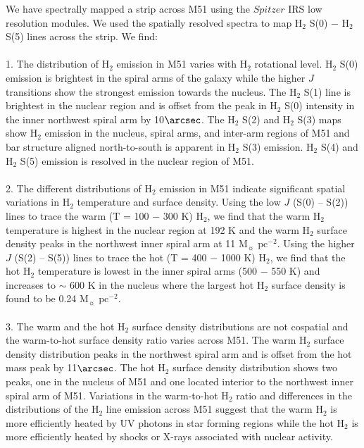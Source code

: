 \documentclass[manuscript]{aastex}
\begin{document}
We have spectrally mapped a strip across M51 using the $Spitzer$ IRS
low resolution modules.  We used the spatially resolved spectra to map
H$_2$ S(0) $-$ H$_2$ S(5) lines across
the strip.  We find:\\
\\
1.  The distribution of H$_2$
emission in M51 varies with H$_2$ rotational level.
H$_2$ S(0) emission is brightest in the spiral arms of the
galaxy while the higher $J$ transitions show the strongest emission
towards the nucleus.  The H$_2$ S(1) line is brightest
in the nuclear region and is offset from the peak in H$_2$ S(0) 
intensity in the inner northwest spiral arm by 10$\arcsec$.
The H$_2$ S(2) and H$_2$ S(3) maps show
H$_2$ emission in the nucleus, spiral arms, and inter-arm
regions of M51 and bar structure aligned north-to-south is apparent in
H$_2$ S(3) emission.  H$_2$ S(4) and H$_2$
S(5) emission is resolved in the nuclear region of M51.\\
\\
2.  The different distributions of H$_2$ emission in M51
indicate significant spatial variations in H$_2$
temperature and surface density.  Using the low $J$ (S(0) -- S(2)) lines to trace the warm (T = 100
$-$ 300 K) H$_2$, we find that the warm H$_2$
temperature is highest in the nuclear region at 192 K and
the warm H$_2$ surface density peaks in the northwest inner spiral arm
at 11 $\mathrm{M_\sun}$ $\mathrm{pc^{-2}}$.  Using the
higher $J$ (S(2) -- S(5)) lines to trace the hot (T = 400 $-$ 1000 K) H$_2$,
we find that the hot H$_2$ temperature is lowest
in the inner spiral arms (500 $-$ 550 K) and increases to $\sim$ 600 K
in the nucleus where the largest hot H$_2$ surface density
is found to be 0.24 $\mathrm{M_\sun}$ $\mathrm{pc^{-2}}$.\\
\\
3.  The warm and the hot H$_2$ surface density distributions are not
cospatial and the warm-to-hot surface density ratio varies across M51.  The warm
H$_2$ surface density distribution peaks in the northwest spiral arm and is offset from
the hot mass peak by 11$\arcsec$.  The hot H$_2$ surface density distribution 
shows two peaks, one in the nucleus of M51 and one located interior to the 
northwest inner spiral arm of M51.   Variations in the
warm-to-hot H$_2$ ratio and differences in the
distributions of the H$_2$ line emission across 
M51 suggest that the warm H$_2$ is more efficiently heated 
by UV photons in star forming regions while the hot H$_2$ is 
more efficiently heated by shocks or X-rays associated with nuclear activity.\\
\end{document}
